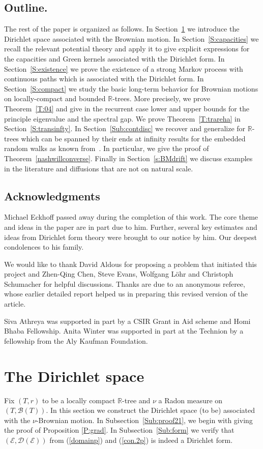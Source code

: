 \documentclass[11pt]{amsart}
\numberwithin{equation}{section}
\begin{document}
{\subsection{Outline.} The rest of the paper is organized as follows. In Section~\ref{S:Dirichlet} we introduce the Dirichlet space associated with the Brownian motion.
In Section~\ref{S:capacities} we recall the relevant potential theory and apply it to give explicit
expressions for the
capacities and Green kernels associated with the Dirichlet form. In Section~\ref{S:existence} we
prove the existence of a strong
Markov process with continuous paths which is associated with the Dirichlet form.
In Section~\ref{S:compact} we study the basic long-term behavior
for Brownian motions on locally-compact and bounded ${{\mathbb R}}$-trees. More precisely,  we prove Theorem~\ref{T:04}
and give in the recurrent case lower and upper bounds for the principle eigenvalue and the spectral gap.  We prove Theorem~\ref{T:trareha} in Section~\ref{S:transinfty}.
In Section~\ref{Sub:contdisc} we recover and generalize for ${{\mathbb R}}$-trees which can be spanned by their ends at infinity results for the embedded
random walks as known from~\cite{Lyo90}. In particular, we give the proof of Theorem~\ref{nashwillconverse}. Finally in Section~\ref{s:BMdrift} we discuss examples in the literature and diffusions that are not on natural scale.

\subsection*{Acknowledgments} Michael Eckhoff passed away during the completion of this work. The core theme and ideas in the paper are in part due to him. Further, several key estimates and ideas from Dirichlet form theory were brought to our notice by him.  Our deepest condolences to his family.

 We would like to thank David Aldous for proposing a problem that initiated this project and Zhen-Qing Chen, Steve Evans, Wolfgang L\"ohr and Christoph Schumacher  for helpful discussions. Thanks are due to an anonymous referee, whose earlier  detailed report helped us in preparing this revised version of the article.  
 
 Siva Athreya was supported in part by a CSIR Grant in Aid scheme and Homi Bhaba Fellowship. Anita Winter was supported in part at the Technion by a fellowship from the Aly Kaufman Foundation.

\section{The Dirichlet space}
\label{S:Dirichlet}
Fix $(T,r)$ to be a locally compact ${{\mathbb R}}$-tree and $\nu$ a Radon measure on $(T,{\mathcal B}(T))$.
In this section we construct the Dirichlet space (to be) associated with the $\nu$-Brownian motion.
In Subsection~\ref{Sub:proof21}, we begin with giving the proof of Proposition \ref{P:grad}. In Subsection~\ref{Sub:form}
we verify that $({\mathcal E},{\mathcal D}({\mathcal E}))$ from (\ref{domainp}) and (\ref{con.2p}) is indeed a Dirichlet form.

}
\end{document}
